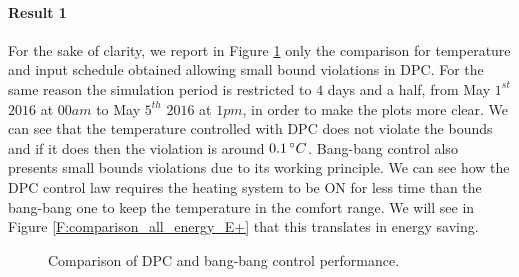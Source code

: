 \paragraph{Result 1} For the sake of clarity, we report in Figure \ref{F:comparison_small} only the comparison for temperature and input schedule obtained allowing small bound violations in DPC.  For the same reason the simulation period is restricted to $4$ days and a half, from May $1^{st}$ $2016$ at $00am$ to May $5^{th}$ $2016$ at $1pm$, in order to make the plots more clear. We can see that the temperature controlled with DPC does not violate the bounds and if it does then the violation is around $0.1\,\degree C$. Bang-bang control also presents small bounds violations due to its working principle. We can see how the DPC control law requires the heating system to be ON for less time than the bang-bang one to keep the temperature in the comfort range. We will see in Figure \ref{F:comparison_all_energy_E+} that this translates in energy saving.

\begin{figure}[h!]
	\begin{center}
	\end{center}
	\caption{Comparison of DPC and bang-bang control performance.}
	\captionsetup{justification=centering}
	\label{F:comparison_small}
\end{figure}

